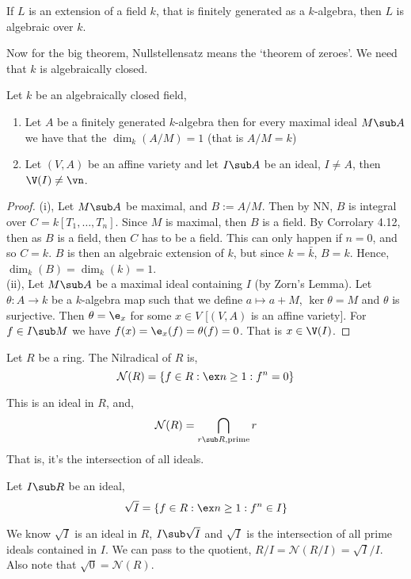 \begin{ncor}
  If $L$ is an extension of a field $k$, that is finitely generated as a $k$-algebra, then $L$ is algebraic over $k$.
\end{ncor}

\noindent
Now for the big theorem, Nullstellensatz means the `theorem of zeroes'. We need that $k$ is algebraically closed.
\begin{nthm}
  Let $k$ be an algebraically closed field,
  \begin{enumerate}
    \item Let $A$ be a finitely generated $k$-algebra then for every maximal ideal $M\sub A$ we have that the $\dim_k (A / M) = 1$ (that is $A/M = k$)
    \item Let $(V, A)$ be an affine variety and let $I \sub A$ be an ideal, $I \ne A$, then $\V(I) \ne \vn$.
  \end{enumerate}
\end{nthm}
\begin{proof}
  (i), Let $M \sub A$ be maximal, and $B := A/M$. Then by NN, $B$ is integral over $C = k[T_1, \dots, T_n]$. Since $M$ is maximal, then $B$ is a field.  By Corrolary 4.12, then as $B$ is a field, then $C$ has to be a field. This can only happen if $n = 0$, and so $C = k$. $B$ is then an algebraic extension of $k$, but since $k = \bar k$, $B = k$. Hence, $\dim_k (B) = \dim_k (k) = 1$.\\

  \noindent
  (ii), Let $M \sub A$ be a maximal ideal containing $I$ (by Zorn's Lemma). Let $\theta : A \to k$ be a $k$-algebra map such that we define $a \mapsto a + M$, $\ker \theta = M$ and $\theta$ is surjective. Then $\theta = \e_x$ for some $x \in V$ [$(V, A)$ is an affine variety]. For $f \in I \sub M$ we have $f(x) = \e_x (f) = \theta(f) = 0$. That is $x \in \V(I)$.
\end{proof}

\noindent
\begin{ndefi}[Nilradical]
  Let $R$ be a ring. The Nilradical of $R$ is,
  $$ \mathcal{N}(R) = \{ f \in R : \ex n \ge 1 : f^n = 0\} $$
\end{ndefi}
\noindent
This is an ideal in $R$, and,
$$ \mathcal{N}(R) = \bigcap_{r \sub R, \text{prime}} r $$
That is, it's the intersection of all ideals.
\begin{ndefi}[Radical]
  Let $I \sub R$ be an ideal,
  $$ \sqrt I = \{f \in R : \ex n \ge 1 : f^n \in I\} $$
\end{ndefi}
We know $\sqrt I$ is an ideal in $R$, $I \sub \sqrt I$ and $\sqrt I$ is the intersection of all prime ideals contained in $I$. We can pass to the quotient, $R / I = \mathcal{N}(R/I) = \sqrt I / I$. Also note that $\sqrt 0 = \mathcal{N}(R)$.

